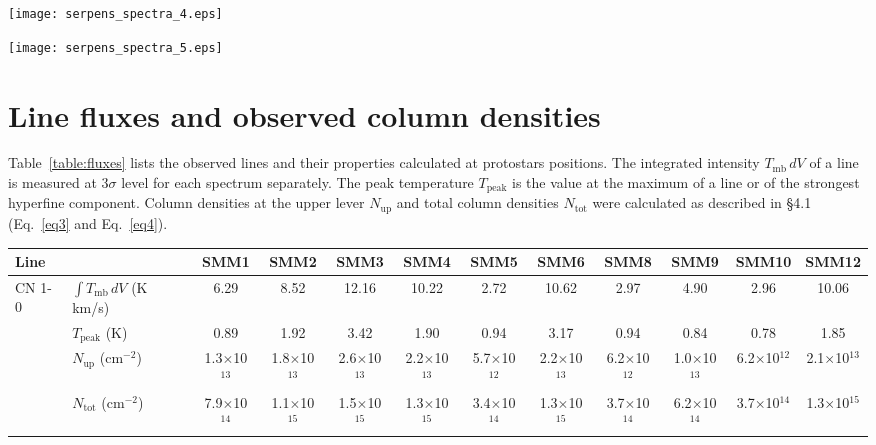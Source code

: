 \documentclass{aa}
\begin{document}
\begin{appendix}
\begin{figure*}
\centering 
\texttt{[image: serpens\_spectra\_4.eps]}
\label{Spectra4} 
\end{figure*}

\begin{figure*} 
\centering
\texttt{[image: serpens\_spectra\_5.eps]} 
\caption{Serpens Main sources spectra of CO(6-5), C$^{34}$S(3-2), CS(3-2), H$^{13}$CN(2-1), H$^{13}$CN(1-0),
 HCN(1-0) and CN(1-0) lines.} 
 \label{Spectra_all}
\end{figure*}

\section{Line fluxes and observed column densities}

Table~\ref{table:fluxes} lists the observed lines and their properties calculated at protostars positions. The integrated intensity $T_{\mathrm{mb}} \, dV$ of a line is measured at 3$\sigma$ level for each spectrum separately. The peak temperature $T_\mathrm{peak}$ is the value at the maximum of a line or of the strongest hyperfine component. Column densities at the upper lever $N_\mathrm{up}$ and total column densities $N_\mathrm{tot}$ were calculated as described in \S 4.1 (Eq.~\ref{eq3} and Eq.~\ref{eq4}).

\begin{sidewaystable*}
\caption{Integrated fluxes of the observed line at the positions of protostars}\label{table:fluxes}
\centering
\begin{tabular}{l l c c c c c c c c c c} 
\hline\hline             
Line &  & SMM1 & SMM2 & SMM3 & SMM4 & SMM5 & SMM6 & SMM8 & SMM9 & SMM10 & SMM12 \\
\hline \multirow{4}{*}{CN 1-0} & $\int{T_{\mathrm{mb}} \, dV}$ (K km/s) & 6.29 & 8.52 & 12.16 & 10.22 & 2.72 & 10.62 & 2.97 & 4.90 & 2.96 & 10.06 \\
& $T_\mathrm{peak}$ (K) & 0.89 & 1.92 & 3.42 & 1.90 & 0.94 & 3.17 & 0.94 & 0.84 & 0.78 & 1.85 \\
& $N_\mathrm{up}$ (cm$^{-2}$) & 1.3$\times$10$^{13}$ & 1.8$\times$10$^{13}$ & 2.6$\times$10$^{13}$ & 2.2$\times$10$^{13}$ & 5.7$\times$10$^{12}$ & 2.2$\times$10$^{13}$ & 6.2$\times$10$^{12}$ & 1.0$\times$10$^{13}$ & 6.2$\times$10$^{12}$ & 2.1$\times$10$^{13}$ \\
& $N_\mathrm{tot}$ (cm$^{-2}$) & 7.9$\times$10$^{14}$ & 1.1$\times$10$^{15}$ & 1.5$\times$10$^{15}$ & 1.3$\times$10$^{15}$ & 3.4$\times$10$^{14}$ & 1.3$\times$10$^{15}$ & 3.7$\times$10$^{14}$ & 6.2$\times$10$^{14}$ & 3.7$\times$10$^{14}$ & 1.3$\times$10$^{15}$\\


\end{tabular}
\end{sidewaystable*}
\end{appendix}
\end{document}
